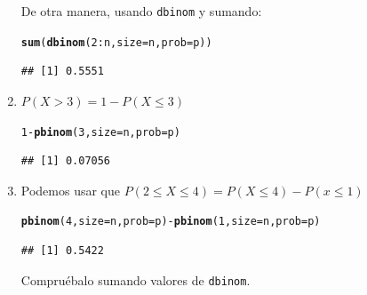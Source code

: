 \documentclass[10pt,a4paper]{article}\usepackage[]{graphicx}\usepackage[]{color}
\makeatletter
\newcommand{\hlnum}[1]{\textcolor[rgb]{0.686,0.059,0.569}{#1}}%
\newcommand{\hlopt}[1]{\textcolor[rgb]{0,0,0}{#1}}%
\newcommand{\hlstd}[1]{\textcolor[rgb]{0.345,0.345,0.345}{#1}}%
\newcommand{\hlkwc}[1]{\textcolor[rgb]{0.333,0.667,0.333}{#1}}%
\newcommand{\hlkwd}[1]{\textcolor[rgb]{0.737,0.353,0.396}{\textbf{#1}}}%
\newenvironment{kframe}{%
 \def\at@end@of@kframe{}%
 \ifinner\ifhmode%
  \def\at@end@of@kframe{\end{minipage}}%
  \begin{minipage}{\columnwidth}%
 \fi\fi%
 \def\FrameCommand##1{\hskip\@totalleftmargin \hskip-\fboxsep
 \colorbox{shadecolor}{##1}\hskip-\fboxsep
     \hskip-\linewidth \hskip-\@totalleftmargin \hskip\columnwidth}%
 \MakeFramed {\advance\hsize-\width
   \@totalleftmargin\z@ \linewidth\hsize
   \@setminipage}}%
 {\par\unskip\endMakeFramed%
 \at@end@of@kframe}
\newenvironment{knitrout}{}{} %
\makeatother
\begin{document}
\begin{enumerate}
\begin{knitrout}
\begin{kframe}
\end{kframe}
\end{knitrout}
      De otra manera, usando {\tt dbinom} y sumando:
\begin{knitrout}
\color{fgcolor}\begin{kframe}
\begin{alltt}
\hlkwd{sum}\hlstd{(}\hlkwd{dbinom}\hlstd{(}\hlnum{2}\hlopt{:}\hlstd{n,} \hlkwc{size} \hlstd{= n,} \hlkwc{prob} \hlstd{= p))}
\end{alltt}
\begin{verbatim}
## [1] 0.5551
\end{verbatim}
\end{kframe}
\end{knitrout}
  \item  $P(X>3) = 1 - P(X\leq 3)$
\begin{knitrout}
\color{fgcolor}\begin{kframe}
\begin{alltt}
\hlnum{1}\hlopt{-} \hlkwd{pbinom}\hlstd{(}\hlnum{3}\hlstd{,} \hlkwc{size} \hlstd{= n,} \hlkwc{prob} \hlstd{= p)}
\end{alltt}
\begin{verbatim}
## [1] 0.07056
\end{verbatim}
\end{kframe}
\end{knitrout}

  \item Podemos usar que $P(2\leq X\leq 4) = P(X\leq 4) - P(x\leq 1)$
\begin{knitrout}
\color{fgcolor}\begin{kframe}
\begin{alltt}
\hlkwd{pbinom}\hlstd{(}\hlnum{4}\hlstd{,} \hlkwc{size} \hlstd{= n,} \hlkwc{prob} \hlstd{= p)} \hlopt{-} \hlkwd{pbinom}\hlstd{(}\hlnum{1}\hlstd{,} \hlkwc{size} \hlstd{= n,} \hlkwc{prob} \hlstd{= p)}
\end{alltt}
\begin{verbatim}
## [1] 0.5422
\end{verbatim}
\end{kframe}
\end{knitrout}
      Compruébalo sumando valores de {\tt dbinom}.


\end{enumerate}
\end{document}
